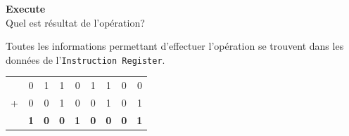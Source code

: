\begin{Exercice}[5 minutes] \textbf{Execute}\\
    Quel est résultat de l'opération?
    \begin{conseil}
        Toutes les informations permettant d'effectuer l'opération se trouvent dans les données de l'\lstinline{Instruction Register}.
    \end{conseil}
    \begin{solution}
        \begin{tabular}{ccccccccc}
            & 0 & 1 & 1 & 0 & 1 & 1 & 0 & 0 \\
          + & 0 & 0 & 1 & 0 & 0 & 1 & 0 & 1 \\
          \hline
            & \textbf{1} & \textbf{0} & \textbf{0} & \textbf{1} & \textbf{0} & \textbf{0} & \textbf{0} & \textbf{1} \\
          \end{tabular}
    \end{solution}
\end{Exercice}


